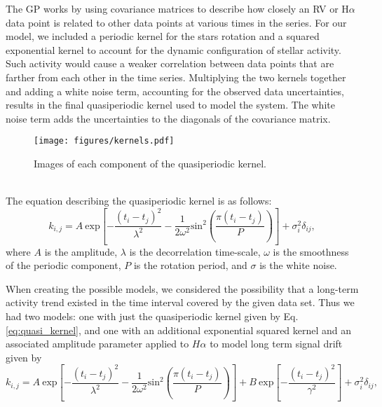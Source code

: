 \documentclass{aastex6}
\begin{document}
The GP works by using covariance matrices to describe how closely an RV or H$\alpha$ data point is related to other data points at various times in the series. For our model, we included a periodic kernel for the stars rotation and a squared exponential kernel to account for the dynamic configuration of stellar activity. Such activity would cause a weaker correlation between data points that are farther from each other in the time series. Multiplying the two kernels together and adding a white noise term, accounting for the observed data uncertainties, results in the final quasiperiodic kernel used to model the system. The white noise term adds the uncertainties to the diagonals of the covariance matrix.
\begin{figure} \label{fig:kernel_visual}
    \begin{center}
    \texttt{[image: figures/kernels.pdf]}
    \caption{Images of each component of the quasiperiodic kernel.}
     \end{center}
\end{figure}\\

The equation describing the quasiperiodic kernel is as follows:
\begin{equation} \label{eq:quasi_kernel}
  k_{i,j} = A\ \mathrm{exp}\left[-\frac{(t_i - t_j)^2}{\lambda^2} - \frac{1}{2\omega^2}\mathrm{sin}^2\left(\frac{\pi(t_i -t_j)}{P}\right)\right] + \sigma_i^2\delta_{ij},%
  \end{equation}
where $A$ is the amplitude, $\lambda$ is the decorrelation time-scale, $\omega$ is the smoothness of the periodic component, $P$ is the rotation period, and $\sigma$ is the white noise.\par
 When creating the possible models, we considered the possibility that a long-term activity trend existed in the time interval covered by the given data set.
 Thus we had two models: one with just the quasiperiodic kernel given by Eq. \ref{eq:quasi_kernel}, and one with an additional exponential squared kernel and an associated amplitude parameter applied to $H\alpha$ to model long term signal drift given by
 \begin{equation} \label{eq:ha_lt_kernel}
 k_{i,j} = A\ \mathrm{exp}\left[-\frac{(t_i - t_j)^2}{\lambda^2} - \frac{1}{2\omega^2}\mathrm{sin}^2\left(\frac{\pi(t_i -t_j)}{P}\right)\right] + B\ \mathrm{exp}\left[-\frac{(t_i - t_j)^2}{\gamma^2}\right] + \sigma_i^2\delta_{ij},
 \end{equation}
 
\end{document}
